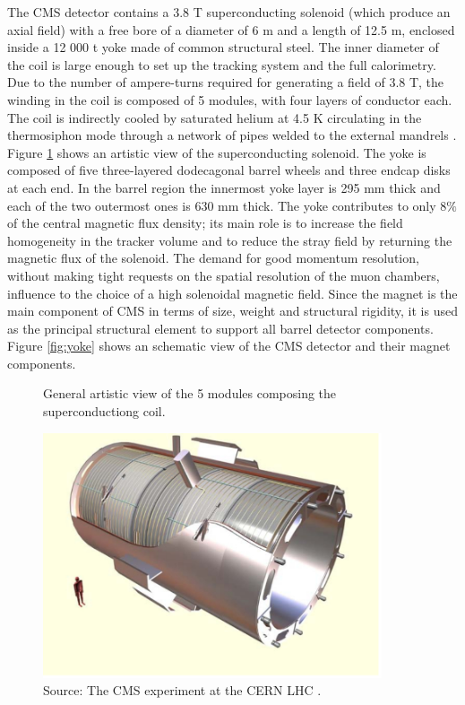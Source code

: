 The CMS detector contains a 3.8 T superconducting solenoid (which produce an axial field) with a free bore of a diameter of 6 m and a length of 12.5 m, enclosed inside a 12 000 t yoke made of common structural steel. The inner diameter of the coil is large enough to set up the tracking system and the full calorimetry. Due to the number of ampere-turns required for generating a field of 3.8 T, the winding in the coil is composed of 5 modules, with four layers of conductor each. The coil is indirectly cooled by saturated helium at 4.5 K circulating in the thermosiphon mode through a network of pipes welded to the external mandrels \cite{Acquistapace:1997fm}. Figure \ref{fig:coil} shows an artistic view of the superconducting solenoid. The yoke is composed of five three-layered dodecagonal barrel wheels and three endcap disks at each end. In the barrel region the innermost yoke layer is 295 mm thick and each of the two outermost ones is 630 mm thick. The yoke contributes to only 8$\%$ of the central magnetic flux density; its main role is to increase the field homogeneity in the tracker volume and to reduce the stray field by returning
the magnetic flux of the solenoid. The demand for good momentum resolution, without making tight requests on the spatial resolution of the muon chambers, influence to the choice of a high solenoidal magnetic field. Since the magnet is the main component of CMS in terms of size, weight and structural rigidity, it is used as the principal structural element to support all barrel detector components. Figure \ref{fig:yoke} shows an schematic view of the CMS detector and their magnet components.

\begin{figure}[H]
\caption{General artistic view of the 5 modules composing the superconductiong coil. \label{fig:coil}}
  \centering
\includegraphics[width=10cm]{CMS_chapter_plots/coil}
\caption*{Source: The CMS experiment at the CERN LHC \cite{1748-0221-3-08-S08004}.}
\end{figure}

